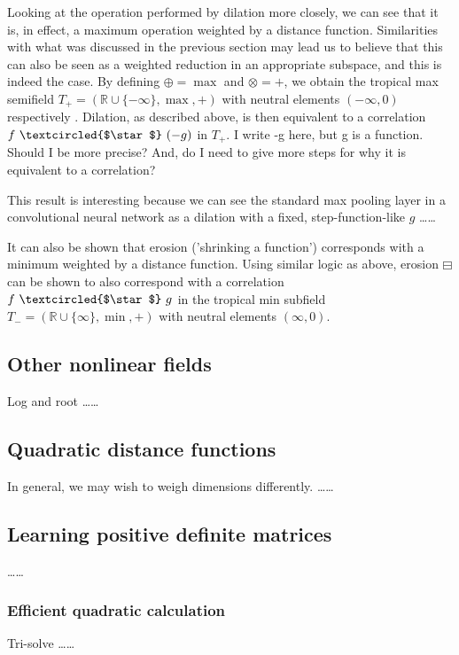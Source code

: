 \documentclass[11pt]{article} %
\def\comment#1{\color{red}#1\color{black}}
\begin{document}
Looking at the operation performed by dilation more closely, we can see that it is, in effect, a maximum operation weighted by a distance function. Similarities with what was discussed in the previous section may lead us to believe that this can also be seen as a weighted reduction in an appropriate subspace, and this is indeed the case. By defining $\oplus=\max$ and $\otimes=+$, we obtain the tropical max semifield $T_+=(\mathbb{R}\cup\{-\infty\},\max,+)$ with neutral elements $(-\infty, 0)$ respectively \cite{bellaardaxiomatic}. Dilation, as described above, is then equivalent to a correlation $f ~\textcircled{$\star$}~ (-g)$ in $T_+$. \comment{I write -g here, but g is a function. Should I be more precise? And, do I need to give more steps for why it is equivalent to a correlation?}

This result is interesting because we can see the standard max pooling layer in a convolutional neural network as a dilation with a fixed, step-function-like $g$ \comment{\ldots\ldots}

It can also be shown that erosion ('shrinking a function') corresponds with a minimum weighted by a distance function. Using similar logic as above, erosion $\boxminus$ can be shown to also correspond with a correlation $f ~\textcircled{$\star$}~ g$ in the tropical min subfield $T_-=(\mathbb{R}\cup\{\infty\},\min,+)$ with neutral elements $(\infty, 0)$.

\subsection{Other nonlinear fields}
Log and root \cite{bellaardaxiomatic} \comment{\ldots\ldots}

\subsection{Quadratic distance functions}
In general, we may wish to weigh dimensions differently. \comment{\ldots\ldots}


\subsection{Learning positive definite matrices}
\comment{\ldots\ldots}

\subsubsection{Efficient quadratic calculation}
Tri-solve \comment{\ldots\ldots}



\end{document}
